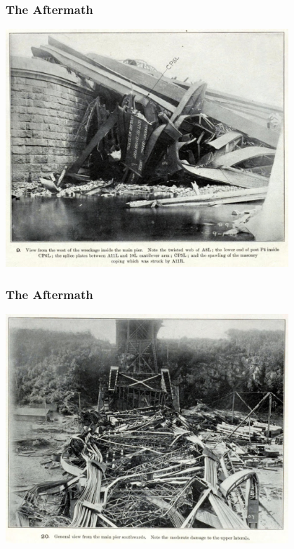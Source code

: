 \begin{frame}
\frametitle{The Aftermath}

\begin{center}
 \includegraphics[width=0.8\textwidth]{images/collapse1}
\end{center}


\end{frame}
\begin{frame}
\frametitle{The Aftermath}

\begin{center}
 \includegraphics[width=0.8\textwidth]{images/collapse2}
\end{center}


\end{frame}

